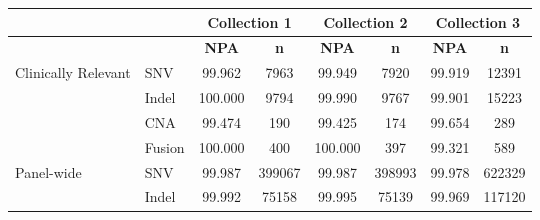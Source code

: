 \begin{tabular}{|l|l|c|c|c|c|c|c|}
\hline
\rowcolor[gray]{.85}            &         &  \multicolumn{2}{c|}{\textbf{Collection 1}}  &  \multicolumn{2}{c|}{\textbf{Collection 2}}  &  \multicolumn{2}{c|}{\textbf{Collection 3}} \\ \hline
\rowcolor[gray]{.85}            &         & \textbf{NPA} & \textbf{n} & \textbf{NPA} & \textbf{n} & \textbf{NPA} & \textbf{       n }\\ \hline
\multirow{4}{*}{Clinically Relevant} & SNV &       99.962 &    7963 &       99.949 &    7920 &       99.919 &   12391 \\ \cline{2-8}
           & Indel &      100.000 &    9794 &       99.990 &    9767 &       99.901 &   15223 \\ \cline{2-8}
           & CNA &       99.474 &     190 &       99.425 &     174 &       99.654 &     289 \\ \cline{2-8}
           & Fusion &      100.000 &     400 &      100.000 &     397 &       99.321 &     589 \\ \hline
\multirow{2}{*}{Panel-wide} & SNV &       99.987 &  399067 &       99.987 &  398993 &       99.978 &  622329 \\ \cline{2-8}
           & Indel &       99.992 &   75158 &       99.995 &   75139 &       99.969 &  117120 \\ \hline
\end{tabular}